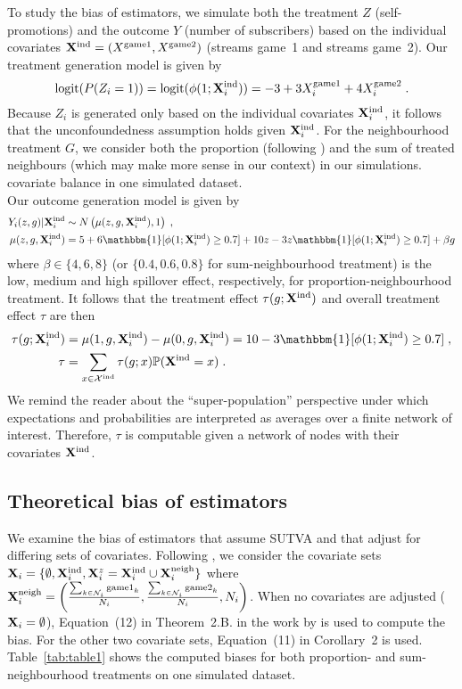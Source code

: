 \documentclass[10pt]{article}
\begin{document}
To study the bias of estimators, we simulate both the treatment $Z$ (self-promotions) and the outcome $Y$ (number of subscribers) based on the individual covariates $\mathbf{X}^{\text{ind}}=(X^\text{game1},X^\text{game2})$ (streams game~1 and streams game~2). Our treatment generation model is given by
\[
\text{logit}(P(Z_i=1)) = \text{logit}(\phi(1;\mathbf{X}^{\text{ind}}_i)) = -3 + 3X_i^\text{game1} + 4X_i^\text{game2} \;.
\]
Because $Z_i$ is generated only based on the individual covariates $\mathbf{X}^{\text{ind}}_i$, it follows that the unconfoundedness assumption holds given $\mathbf{X}^{\text{ind}}_i$. For the neighbourhood treatment $G$, we consider both the proportion (following \citeauthor{Forastiere:2021}) and the sum of treated neighbours (which may make more sense in our context) in our simulations. \todo covariate balance in one simulated dataset.
\\

Our outcome generation model is given by
\begin{align*}
Y_i(z,g)|\Xind_i &\sim N\left(\mu(z,g,\Xind_i),1\right) \;, \\
\mu(z,g,\Xind_i) &= 5 + 6\mathbbm{1}[\phi(1;\Xind_i)\geq 0.7] + 10z - 3z\mathbbm{1}[\phi(1;\Xind_i)\geq0.7] + \beta g
\end{align*}
where $\beta\in\{4,6,8\}$ (or $\{0.4,0.6,0.8\}$ for sum-neighbourhood treatment) is the low, medium and high spillover effect, respectively, for proportion-neighbourhood treatment. It follows that the treatment effect $\tau(g;
\mathbf{X}^{\text{ind}})$ and overall treatment effect $\tau$ are then
\begin{align*}
\tau(g;\Xind_i) &= \mu(1,g,\Xind_i) - \mu(0,g,\Xind_i) = 10 - 3\mathbbm{1}[\phi(1;\Xind_i)\geq0.7] \;, \\
\tau &= \sum_{x\in\calX^\text{ind}}\tau(g;x)\P(\Xind=x) \;.
\end{align*}
We remind the reader about the ``super-population'' perspective \parencite{Imbens:2015} under which expectations and probabilities are interpreted as averages over a finite network of interest. Therefore, $\tau$ is computable given a network of nodes with their covariates $\mathbf{X}^{\text{ind}}$.

\subsection{Theoretical bias of estimators}

We examine the bias of estimators that assume SUTVA and that adjust for differing sets of covariates. Following \textcite{Forastiere:2021}, we consider the covariate sets $\mathbf{X}_i=\{\emptyset,\mathbf{X}^{\text{ind}}_i,\mathbf{X}_i^z=\mathbf{X}^{\text{ind}}_i\cup\mathbf{X}^{\text{neigh}}_i\}$ where $\mathbf{X}^{\text{neigh}}_i=\left(\frac{\sum_{k\in\mathcal{N}_i}\text{game1}_k}{N_i},\frac{\sum_{k\in\mathcal{N}_i}\text{game2}_k}{N_i},N_i\right)$. When no covariates are adjusted ($\mathbf{X}_i=\emptyset$), Equation~(12) in Theorem~2.B. in the work by \textcite{Forastiere:2021} is used to compute the bias. For the other two covariate sets, Equation~(11) in Corollary~2 is used. Table~\ref{tab:table1} shows the computed biases for both proportion- and sum-neighbourhood treatments on one simulated dataset.
\\
\end{document}
